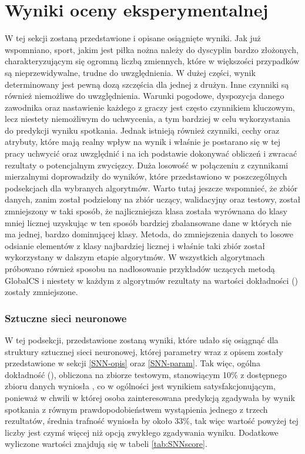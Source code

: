 \chapter{Wyniki oceny eksperymentalnej}

W tej sekcji zostaną przedstawione i opisane osiągnięte wyniki. Jak już wspomniano, sport, jakim jest piłka nożna należy do dyscyplin bardzo złożonych, charakteryzującym się ogromną liczbą zmiennych, które w większości przypadków są nieprzewidywalne, trudne do uwzględnienia. W dużej części, wynik determinowany jest pewną dozą szczęścia dla jednej z drużyn. Inne czynniki są również niemożliwe do uwzględnienia. Warunki pogodowe, dyspozycja danego zawodnika oraz nastawienie każdego z graczy jest często czynnikiem kluczowym, lecz niestety niemożliwym do uchwycenia, a tym bardziej w celu wykorzystania do predykcji wyniku spotkania. Jednak istnieją również czynniki, cechy oraz atrybuty, które mają realny wpływ na wynik i właśnie je postarano się w tej pracy uchwycić oraz uwzględnić i na ich podstawie dokonywać obliczeń i zwracać rezultaty o potencjalnym zwycięzcy. Duża losowość w połączeniu z czynnikami mierzalnymi doprowadziły do wyników, które przedstawiono w poszczególnych podsekcjach dla wybranych algorytmów. Warto tutaj jeszcze wspomnieć, że zbiór danych, zanim został podzielony na zbiór uczący, walidacyjny oraz testowy, został zmniejszony w taki sposób, że najliczniejsza klasa została wyrównana do klasy mniej licznej uzyskując w ten sposób bardziej zbalansowane dane w których nie ma jednej, bardzo dominującej klasy. Metoda, do zmniejszenia danych to losowe odsianie elementów z klasy najbardziej licznej i właśnie taki zbiór został wykorzystany w dalszym etapie algorytmów. W wszystkich algorytmach próbowano również sposobu na nadlosowanie przykładów uczących metodą GlobalCS \cite{GlobalCS} i niestety w każdym z algorytmów rezultaty na wartości dokładności () zostały zmniejszone.

\subsection{Sztuczne sieci neuronowe}
\label{SNN-results}
W tej podsekcji, przedstawione zostaną wyniki, które udało się osiągnąć dla struktury sztucznej sieci neuronowej, której parametry wraz z opisem zostały przedstawione w sekcji \ref{SNN-opis} oraz \ref{SNN-param}. Tak więc, ogólna dokładność (), obliczona na zbiorze testowym, stanowiącym 10\% z dostępnego zbioru danych wyniosła , co w ogólności jest wynikiem satysfakcjonującym, ponieważ w chwili w której osoba zainteresowana predykcją zgadywała by wynik spotkania z równym prawdopodobieństwem wystąpienia jednego z trzech rezultatów, średnia trafność wyniosła by około 33\%, tak więc wartość powyżej tej liczby jest czymś więcej niż opcją zwykłego zgadywania wyniku. Dodatkowe wyliczone wartości znajdują się w tabeli \ref{tab:SNNscore}.

